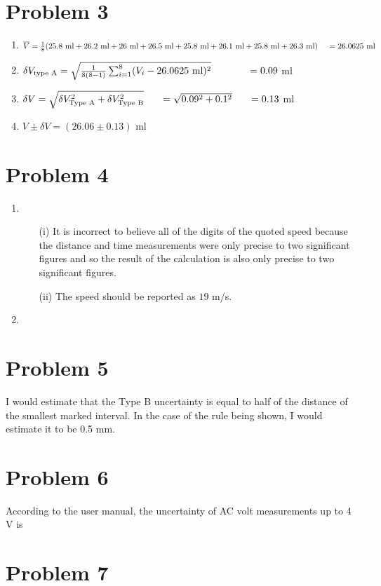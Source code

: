 \documentclass[12pt]{article}
\begin{document}
    \section*{Problem 3}
    \begin{enumerate}
        \item \(\overline{V} = \frac{1}{8}(25.8\text{ ml} + 26.2\text{ ml} + 26\text{ ml} + 26.5\text{ ml} + 25.8\text{ ml} + 26.1\text{ ml} + 25.8\text{ ml} + 26.3\text{ ml})\\~~~\,= 26.0625\text{ ml}\)
        \item \(\delta V_{\text{type A}} = \sqrt{\frac{1}{8(8-1)}\sum_{i=1}^{8}(V_i-26.0625\text{ ml})^2}\\~~~~\quad\quad~=0.09\) ml
        \item \(\delta V = \sqrt{\delta V^2_\text{Type A} + \delta V^2_\text{Type B}}\\~~~~~=\sqrt{0.09^2 + 0.1^2}\\~~~~~=0.13\) ml
        \item \(V\pm\delta V = (26.06\pm0.13)\) ml
    \end{enumerate}

    \section*{Problem 4}
    \begin{enumerate}
        \item \begin{enumerate}
            \item[(i)] It is incorrect to believe all of the digits of the quoted speed because the distance and time measurements were only precise to two significant figures and so the result of the calculation is also only precise to two significant figures.
            \item[(ii)] The speed should be reported as \(19\) m/s.
        \end{enumerate}
        \item 
    \end{enumerate}

    \section*{Problem 5}
    I would estimate that the Type B uncertainty is equal to half of the distance of the smallest marked interval. In the case of the rule being shown, I would estimate it to be 0.5 mm.

    \section*{Problem 6}
    According to the user manual, the uncertainty of AC volt measurements up to 4 V is 
    \section*{Problem 7}
\end{document}

